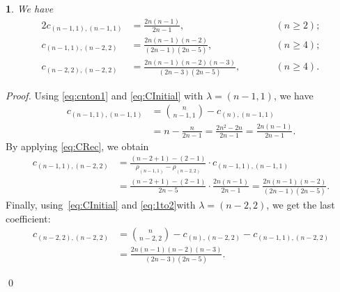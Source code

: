 \documentclass[smallextended]{svjour3}
\newtheorem{thm}{\protect\theoremname}
\providecommand{\theoremname}{Theorem}
\begin{document}
\begin{thm}
\label{thm:fam1}
We have
\begin{alignat*}{2}
  c_{(n-1,1),(n-1,1)} &= \frac{2n(n-1)}{2n-1}, &\qquad& (n\geq2);\\
  c_{(n-1,1),(n-2,2)} &= \frac{2n(n-1)(n-2)}{(2n-1)(2n-5)}, && (n\geq4); \\
  c_{(n-2,2),(n-2,2)} &= \frac{2n(n-1)(n-2)(n-3)}{(2n-3)(2n-5)}, &&(n\geq4).
\end{alignat*}
\end{thm}
\begin{proof}
Using \eqref{eq:cnton1} and  \eqref{eq:CInitial} with $\lambda=(n-1,1)$, we have
\begin{align*}
 c_{(n-1,1),(n-1,1)}&=\binom{n}{n-1,1}-c_{(n),(n-1,1)}\\
&=n-\frac{n}{2n-1}=\frac{2n^{2}-2n}{2n-1}=\frac{2n\left(n-1\right)}{2n-1}.
\end{align*}
By applying \eqref{eq:CRec}, we obtain
\begin{align*}
  c_{(n-1,1),(n-2,2)}
  &= \frac{(n-2+1)-(2-1)}{\rho_{(n-1,1)}-\rho_{(n-2,2)}}\cdot c_{(n-1,1),(n-1,1)}\\
  &= \frac{(n-2+1)-(2-1)}{2n-5}\cdot\frac{2n(n-1)}{2n-1}= \frac{2n(n-1)(n-2)}{(2n-1)(2n-5)}.
\end{align*}
Finally, using~\eqref{eq:CInitial} and \eqref{eq:1to2}with $\lambda=(n-2,2)$, we get the last coefficient:
\begin{align*}
 c_{(n-2,2),(n-2,2)}&=\binom{n}{n-2,2}-c_{(n),(n-2,2)}-c_{(n-1,1),(n-2,2)}\\
&=\frac{2n(n-1)(n-2)(n-3)}{(2n-3)(2n-5)}.
\end{align*}
\vspace{-40pt}

\null\qed
\end{proof}
\end{document}

